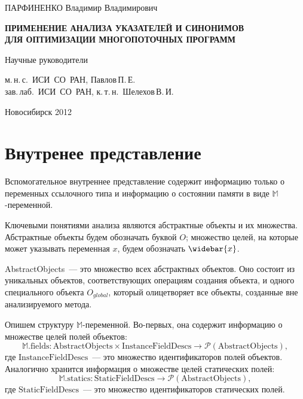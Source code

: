 \documentclass[14pt,titlepage,draft]{extarticle}
\newcommand{\M}{\ensuremath{\mathbb{M}}}
\newcommand{\Mfield}[1]{\textrm{#1}}
\newcommand{\Mhyp}{$\mathbb{M}$\hyp}
\newcommand{\pts}[1]{\widebar{#1}}
\newcommand{\powerset}[1]{\mathcal{P}(#1)}
\let\oldsection\section
\renewcommand{\section}{\newpage\oldsection}
\begin{document}
\begin{center}
{      \vspace{0.2cm}

      ПАРФИНЕНКО Владимир Владимирович

      \vspace{1.5cm}

      \textbf{
        ПРИМЕНЕНИЕ АНАЛИЗА УКАЗАТЕЛЕЙ И СИНОНИМОВ\\
        ДЛЯ ОПТИМИЗАЦИИ МНОГОПОТОЧНЫХ ПРОГРАММ
      }

      \vspace{2.5cm}

      \begin{flushright}

        Научные руководители

        м.\,н.\,с.~ИСИ~СО~РАН, Павлов\,П.\,Е.\\
        зав.\,лаб.~ИСИ~СО~РАН, к.\,т.\,н.~Шелехов\,В.\,И.

      \end{flushright}

      \vspace {4cm}

      Новосибирск 2012
    }
  \end{center}

  \listoftodos

  \tableofcontents

  \section{Внутренее представление}

    Вспомогательное внутреннее представление содержит информацию только о
    переменных ссылочного типа и информацию о состоянии памяти в виде
    \Mhyp переменной.

    Ключевыми понятиями анализа являются абстрактные объекты и их множества.
    Абстрактные объекты будем обозначать буквой $O$; множество целей, на
    которые может указывать переменная $x$, будем обозначать $\pts{x}$.

    \textrm{AbstractObjects}~--- это множество всех абстрактных объектов. Оно
    состоит из уникальных объектов, соответствующих операциям создания объекта,
    и одного специального объекта $O_{global}$, который олицетворяет все
    объекты, созданные вне анализируемого метода.

    Опишем структуру \Mhyp переменной. Во-первых, она содержит информацию о
    множестве целей полей объектов:
    \[ \M.\Mfield{fields}\colon
      \textrm{AbstractObjects} \times \textrm{InstanceFieldDescs} \to
      \powerset{\textrm{AbstractObjects}},
    \]
    где $\textrm{InstanceFieldDescs}$~--- это множество идентификаторов полей
    объектов.
    Аналогично хранится информация о множестве целей статических полей:
    \[ \M.\Mfield{statics}\colon
      \textrm{StaticFieldDescs} \to
      \powerset{\textrm{AbstractObjects}},
    \]
    где $\textrm{StaticFieldDescs}$~--- это множество идентификаторов
    статических полей.
\end{document}
